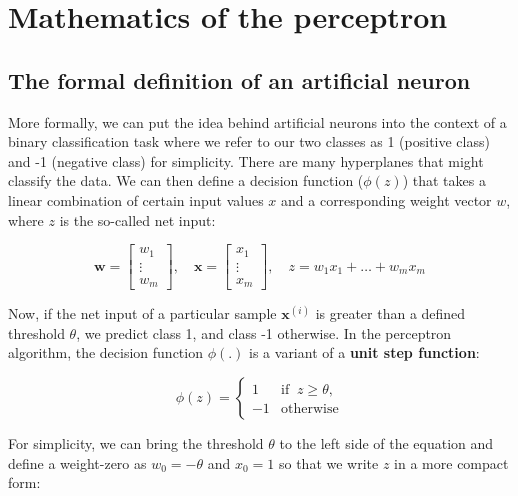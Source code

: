 \documentclass[11pt]{article}
\newcommand{\vect}[1]{\boldsymbol{#1}}
\begin{document}
    \section{Mathematics of the perceptron} \label{sec:perc_math}

    \subsection{The formal definition of an artificial neuron} \label{subsec:neuron_def}

    More formally, we can put the idea behind artificial neurons into the context of a binary classification task where we refer to our two classes as 1 (positive class) and -1 (negative class) for simplicity.
    There are many hyperplanes that might classify the data.
    We can then define a decision function ($\phi(z)$) that takes a linear combination of certain input values $x$ and a corresponding weight vector $w$, where $z$ is the so-called net input:

    \begin{equation}
        \label{eq:z}
        \vect{w} = \begin{bmatrix}
                       w_1 \\ \vdots \\ w_m
        \end{bmatrix}, \quad
        \vect{x} = \begin{bmatrix}
                       x_1 \\ \vdots \\ x_m
        \end{bmatrix}, \quad
        z = w_1 x_1 + \dots + w_m x_m
    \end{equation}

    Now, if the net input of a particular sample $\vect{x}^{(i)}$ is greater than a defined threshold $\theta$, we predict class 1, and class -1 otherwise.
    In the perceptron algorithm, the decision function $\phi(.)$ is a variant of a \textbf{unit step function}:

    \begin{equation}
        \label{eq:perc_dec_func}
        \phi(z) =
        \begin{cases}
            1 & {\text{if }}\ z \geq \theta,\\
            -1 & {\text{otherwise}}
        \end{cases}
    \end{equation}

    For simplicity, we can bring the threshold $\theta$ to the left side of the equation and define a weight-zero as $w_0 = - \theta$ and $x_0 = 1$ so that we write $z$ in a more compact form:
\end{document}
